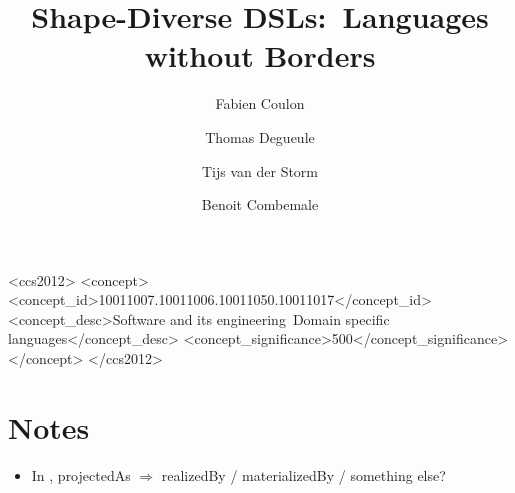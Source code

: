 \documentclass[sigplan, screen]{acmart}
\begin{document}
\title{Shape-Diverse DSLs:~Languages without Borders}

\author{Fabien Coulon}

\author{Thomas Degueule}

\author{Tijs van der Storm}

\author{Benoit Combemale}




%
%
 \begin{CCSXML}
	<ccs2012>
	<concept>
	<concept_id>10011007.10011006.10011050.10011017</concept_id>
	<concept_desc>Software and its engineering~Domain specific languages</concept_desc>
	<concept_significance>500</concept_significance>
	</concept>
	</ccs2012>
\end{CCSXML}




\maketitle






\clearpage
\balance



\clearpage
\section*{Notes}

\begin{itemize}
	\item In , projectedAs $\Rightarrow$ realizedBy / materializedBy / something else?
\end{itemize}
\end{document}
